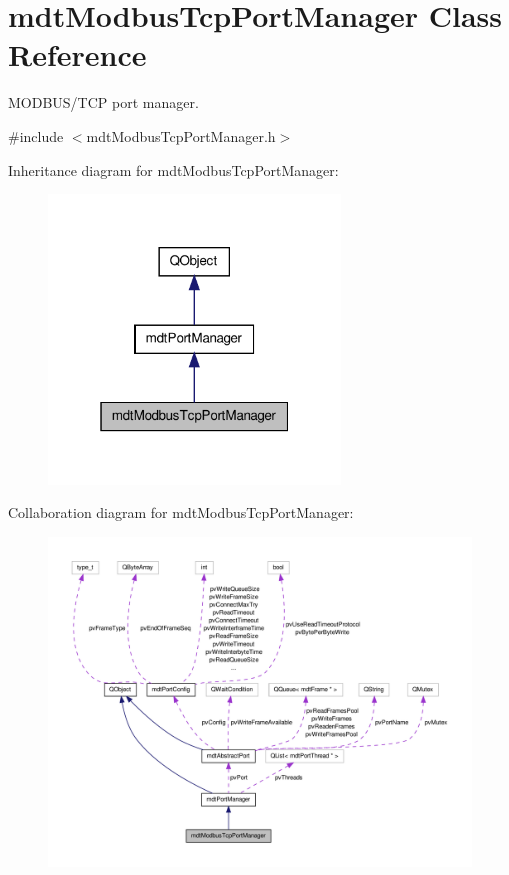 \hypertarget{classmdt_modbus_tcp_port_manager}{\section{mdt\-Modbus\-Tcp\-Port\-Manager Class Reference}
\label{classmdt_modbus_tcp_port_manager}
}


M\-O\-D\-B\-U\-S/\-T\-C\-P port manager.  




{\ttfamily \#include $<$mdt\-Modbus\-Tcp\-Port\-Manager.\-h$>$}



Inheritance diagram for mdt\-Modbus\-Tcp\-Port\-Manager\-:\nopagebreak
\begin{figure}[H]
\begin{center}
\leavevmode
\includegraphics[width=220pt]{classmdt_modbus_tcp_port_manager__inherit__graph}
\end{center}
\end{figure}


Collaboration diagram for mdt\-Modbus\-Tcp\-Port\-Manager\-:\nopagebreak
\begin{figure}[H]
\begin{center}
\leavevmode
\includegraphics[width=350pt]{classmdt_modbus_tcp_port_manager__coll__graph}
\end{center}
\end{figure}
